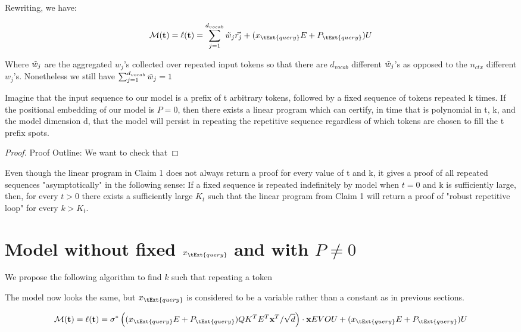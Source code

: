 Rewriting, we have:

\[\mathcal{M}(\textbf{t}) = \ell(\textbf{t}) =  \sum_{j=1}^{d_{vocab}}  \Tilde{w}_j \vec{r_j} + (x_{\tExt{query}}E+P_{\tExt{query}})U\]
 
 Where $\Tilde{w}_j$ are the aggregated $w_j$'s collected over repeated input tokens so that there are $d_{vocab}$ different $\Tilde{w}_j$'s as opposed to the $n_{ctx}$ different $w_j$'s.  Nonetheless we still have $\sum_{j=1}^{d_{vocab}}\Tilde{w}_j = 1$
     
\begin{claim}
     Imagine that the input sequence to our model is a prefix of t arbitrary tokens, followed by a fixed sequence of tokens repeated k times.  If the positional embedding of our model is $P=0$, then there exists a linear program which can certify, in time that is polynomial in t, k, and the model dimension d, that the model will persist in repeating the repetitive sequence regardless of which tokens are chosen to fill the t prefix spots.
\end{claim}


\begin{proof}
    Proof Outline:  We want to check that 
\end{proof}

\begin{claim}
    Even though the linear program in Claim 1 does not always return a proof for every value of t and k, it gives a proof of all repeated sequences "asymptotically" in the following sense:  If a fixed sequence is repeated indefinitely by model when $t = 0$ and k is sufficiently large, then, for every $t>0$ there exists a sufficiently large $K_t$ such that the linear program from Claim 1 will return a proof of "robust repetitive loop" for every $k > K_t$.
\end{claim}



\section{Model without fixed $x_{\tExt{query}}$ and with $P \neq 0$}
We propose the following algorithm to find $k$ such that repeating a token 

The model now looks the same, but $x_{\tExt{query}}$ is considered to be a variable rather than a constant as in previous sections. 

\[\mathcal{M}(\textbf{t}) = \ell(\textbf{t}) = \sigma^* 
 \left ( (x_{\tExt{query}} E + P_{\tExt{query}}) Q K^T   E^T \textbf{x}^T /\sqrt{d} \right ) \cdot \textbf{x}EVOU + (x_{\tExt{query}}E+P_{\tExt{query}})U\]

